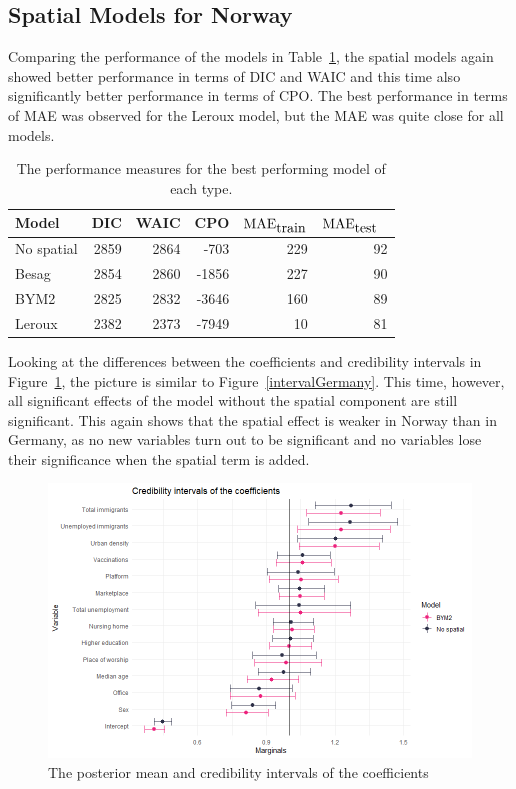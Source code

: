 \subsection{Spatial Models for Norway}\label{sec:spatial_norway}
Comparing the performance of the models in Table~\ref{allNorway}, the spatial models again showed better performance in terms of DIC and WAIC and this time also significantly better performance in terms of CPO. The best performance in terms of MAE was observed for the Leroux model, but the MAE was quite close for all models.
\begin{table}[H] 
\caption{The performance measures for the best performing model of each type. \label{allNorway}}
\begin{tabular}{l r r r r r}
\toprule
\textbf{Model}	& \textbf{DIC}	& \textbf{WAIC} & \textbf{CPO} & \textbf{$\hbox{MAE}_{\hbox{train}}$} & \textbf{$\hbox{MAE}_{\hbox{test}}$}\ \\
\midrule
No spatial & 2859 & 2864 & -703 & 229 & 92 \\
Besag & 2854 & 2860 & -1856 & 227 & 90 \\
BYM2 & 2825 & 2832 & -3646 & 160 & 89\\
Leroux & 2382 & 2373 & -7949 & 10 & 81\\
\bottomrule
\end{tabular}
\end{table}
Looking at the differences between the coefficients and credibility intervals in Figure~\ref{intervalNorway}, the picture is similar to Figure~\ref{intervalGermany}. This time, however, all significant effects of the model without the spatial component are still significant. This again shows that the spatial effect is weaker in Norway than in Germany, as no new variables turn out to be significant and no variables lose their significance when the spatial term is added.
\begin{figure}[H]
  \centering
  \includegraphics[width = \textwidth]{intervals_norway.png}
  \caption{The posterior mean and credibility intervals of the coefficients}
  \label{intervalNorway}
\end{figure}
